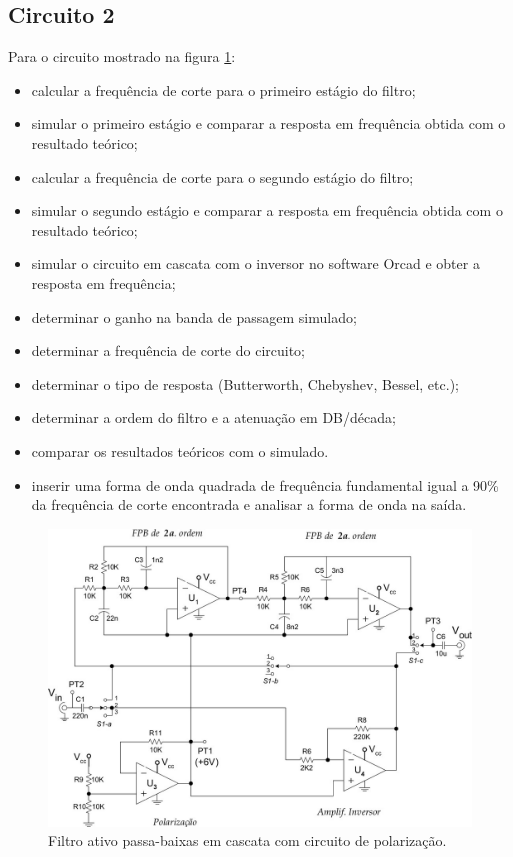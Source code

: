 \subsection{Circuito 2}
Para o circuito mostrado na figura \ref{f_cir2}:

\begin{itemize}
\item calcular a frequência de corte para o primeiro estágio do filtro;
\item simular o primeiro estágio e comparar a resposta em frequência obtida com o resultado teórico;
\item calcular a frequência de corte para o segundo estágio do filtro;
\item simular o segundo estágio e comparar a resposta em frequência obtida com o resultado teórico;
\item simular o circuito em cascata com o inversor no software Orcad e obter a resposta em frequência;
\item determinar o ganho na banda de passagem simulado;
\item determinar a frequência de corte do circuito;
\item determinar o tipo de resposta (Butterworth, Chebyshev, Bessel, etc.);
\item determinar a ordem do filtro e a atenuação em DB/década;
\item comparar os resultados teóricos com o simulado.
\item inserir uma forma de onda quadrada de frequência fundamental igual a 90\% da frequência de corte encontrada e analisar a forma de onda na saída.
\end{itemize}

\begin{figure}[H]
\centering
\includegraphics[scale=0.2]{Imagens/cir2.jpg}
\caption{Filtro ativo passa-baixas em cascata com circuito de polarização.}
\label{f_cir2}
\end{figure}